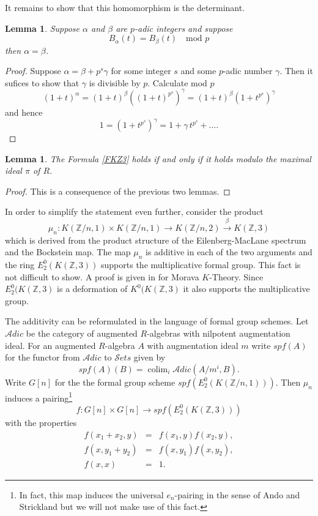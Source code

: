 \documentclass{amsart}
\DeclareMathOperator*{\colim}{colim}
\newcommand {\Z}{{\mathbb Z}}
\newcommand{\lra}{\longrightarrow}              %
\newcommand{\cat}{\mathcal}    %
\numberwithin{equation}{section}
\newtheorem{lemma}[thm]{Lemma}
\theoremstyle{definition}  %
\newtheorem{set theory}[thm]{Set Theoretic Prelude}
\begin{document}
It remains to show that this homomorphism is the determinant.
\begin{lemma}
Suppose $\alpha$ and $ \beta $ are $p$-adic integers and suppose
$$B_\alpha (t) = B_\beta  (t)\quad \mbox{mod } p$$
then $\alpha = \beta$.
\end{lemma}

\begin{proof}
Suppose $\alpha = \beta +p^s\gamma$ for some integer $s$ and some $p$-adic number $\gamma$. Then it sufices to show that $\gamma$ is divisible by $p$. Calculate mod $p$
$$
(1+t)^\alpha =(1+t)^\beta ((1+t)^{p^s})^\gamma =(1+t)^\beta (1+t^{p^s})^\gamma$$
and hence
$$ 1=(1+t^{p^s})^\gamma = 1+ \gamma \,  t^{p^s}+ \ldots. $$
\end{proof}
\begin{lemma}\label{MKZ3}
The Formula \ref{FKZ3}
 holds if and only if it holds modulo the maximal ideal $\pi$ of $R$.
\end{lemma}
\begin{proof} This is a consequence of the previous two lemmas.
\end{proof}
In order to simplify the statement even further, consider the product 
$$\mu_n: K(\Z/n,1)\times  K(\Z/n,1) \lra K(\Z/n, 2)\stackrel{\beta}\to K(\Z,3)$$
which is derived from the product structure of the Eilenberg-MacLane spectrum and the Bockstein map.  
The map $\mu_n$  is additive in each of the two arguments and the ring 
$E_2^0(K(\Z ,3))$ supports the multiplicative formal group. This fact is not difficult to show. A proof is given in  \cite[Proposition 3.2]{W13} for Morava $K$-Theory.  
Since $ E_2^0(K(\Z ,3) $ is a deformation of $K ^0(K(\Z ,3)$ it also supports the multiplicative group.

The additivity can be reformulated in the language of formal group schemes. Let ${\cat A}dic$ be the category of augmented $R$-algebras  with nilpotent augmentation ideal. For an augmented $R$-algebra  $A$  with augmentation ideal $m$ write $spf(A)$ for the functor from ${\cat A}dic$ to ${\cat S}ets$ given by 
$$spf(A)(B)=\colim_i {\cat A}dic(A/m^i,B).$$
 Write $G[n]$ for the  the formal group scheme $spf(E_2^0(K(\Z/n ,1)))$. Then 
$\mu_n$ induces a pairing\footnote{In fact, this map induces the universal $e_n$-pairing in the sense of Ando and Strickland \cite[Proposition 2.3]{MR1791270} but we will not make use of this fact. } 
$$ f: G[n]\times G[n] \lra spf(E_2^0(K(\Z,3)))$$
with the properties 
\begin{eqnarray*}
f(x_1+x_2,y)&=&f(x_1,y)f(x_2,y),\\
f(x,y_1+y_2)&=&f(x,y_1)f(x,y_2),\\
f(x,x)&=&1.
\end{eqnarray*}
\end{document}
